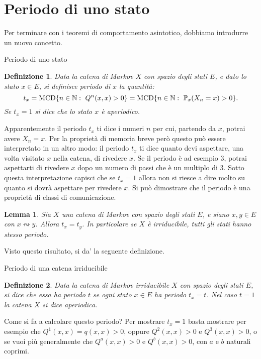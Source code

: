\documentclass[11pt]{book}
\theoremstyle{Definizione}
\newtheorem*{mydef}{Definizione}
\theoremstyle{TeoremaProposizioneLemmaCorollario}
\newtheorem{mylem}[myteo]{Lemma}
\theoremstyle{OsservazioneNota}
\newcommand{\N}{\mathbb{N}}
\renewcommand{\P}{\mathbb{P}}
\newcommand{\comunica}{\leftrightsquigarrow}
\begin{document}
\section{Periodo di uno stato}
Per terminare con i teoremi di comportamento asintotico, dobbiamo introdurre un nuovo concetto.
\begin{boxdef}{Periodo di uno stato}
\begin{mydef}
Data la catena di Markov $X$ con spazio degli stati $E$, e dato lo stato $x\in E$, si definisce periodo di $x$ la quantità:
$$
t_x = \textup{MCD}\{n\in \N:\ Q^n(x,x) > 0\} = \textup{MCD}\{n\in \N:\ \P_x(X_n = x) > 0\}.
$$
Se $t_x = 1$ si dice che lo stato $x$ è aperiodico.
\end{mydef}
\end{boxdef}
\noindent
Apparentemente il periodo $t_x$ ti dice i numeri $n$ per cui, partendo da $x$, potrai avere $X_n = x$. Per la proprietà di memoria breve però questo può essere interpretato in un altro modo: il periodo $t_x$ ti dice quanto devi aspettare, una volta visitato $x$ nella catena, di rivedere $x$. Se il periodo è ad esempio $3$, potrai aspettarti di rivedere $x$ dopo un numero di passi che è un multiplo di $3$. Sotto questa interpretazione capisci che se $t_x = 1$ allora non si riesce a dire molto su quanto si dovrà aspettare per rivedere $x$.
Si può dimostrare che il periodo è una proprietà di classi di comunicazione.
\begin{boxoss}
\begin{mylem}
Sia $X$ una catena di Markov con spazio degli stati $E$, e siano $x,y\in E$ con $x \comunica y$. Allora $t_x = t_y$. In particolare se $X$ è irriducibile, tutti gli stati hanno stesso periodo.
\end{mylem}
\end{boxoss}
\noindent
Visto questo risultato, si da' la seguente definizione.
\begin{boxdef}{Periodo di una catena irriducibile}
\begin{mydef}
Data la catena di Markov irriducibile $X$ con spazio degli stati $E$, si dice che essa ha periodo $t$ se ogni stato $x\in E$ ha periodo $t_x = t$. Nel caso $t = 1$ la catena $X$ si dice aperiodica.
\end{mydef}
\end{boxdef}
\noindent
Come si fa a calcolare questo periodo? Per mostrare $t_x = 1$ basta mostrare per esempio che $Q^1(x,x) = q(x,x) > 0$, oppure $Q^2(x,x) > 0$ e $Q^3(x,x) > 0$, o se vuoi più generalmente che $Q^a(x,x) > 0$ e $Q^b(x,x) > 0$, con $a$ e $b$ naturali coprimi.
\end{document}
